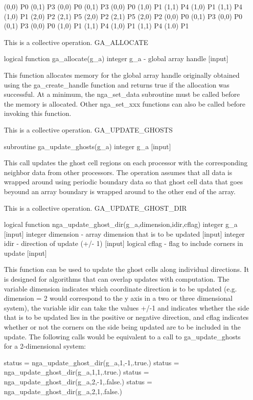 (0,0) P0 (0,1) P3 (0,0) P0 (0,1) P3 (0,0) P0 (1,0) P1 (1,1) P4 (1,0)
P1 (1,1) P4 (1,0) P1 (2,0) P2 (2,1) P5 (2,0) P2 (2,1) P5 (2,0) P2
(0,0) P0 (0,1) P3 (0,0) P0 (0,1) P3 (0,0) P0 (1,0) P1 (1,1) P4 (1,0)
P1 (1,1) P4 (1.0) P1

This is a collective operation. GA\_ALLOCATE

logical function ga\_allocate(g\_a) integer g\_a - global array handle
{[}input{]}

This function allocates memory for the global array handle originally
obtained using the ga\_create\_handle function and returns true if
the allocation was successful. At a minimum, the nga\_set\_data subroutine
must be called before the memory is allocated. Other nga\_set\_xxx
functions can also be called before invoking this function.

This is a collective operation. GA\_UPDATE\_GHOSTS

subroutine ga\_update\_ghosts(g\_a) integer g\_a {[}input{]}

This call updates the ghost cell regions on each processor with the
corresponding neighbor data from other processors. The operation assumes
that all data is wrapped around using periodic boundary data so that
ghost cell data that goes beyound an array boundary is wrapped around
to the other end of the array.

This is a collective operation. GA\_UPDATE\_GHOST\_DIR

logical function nga\_update\_ghost\_dir(g\_a,dimension,idir,cflag)
integer g\_a {[}input{]} integer dimension - array dimension that
is to be updated {[}input{]} integer idir - direction of update (+/-
1) {[}input{]} logical cflag - flag to include corners in update {[}input{]}

This function can be used to update the ghost cells along individual
directions. It is designed for algorithms that can overlap updates
with computation. The variable dimension indicates which coordinate
direction is to be updated (e.g. dimension = 2 would correspond to
the y axis in a two or three dimensional system), the variable idir
can take the values +/-1 and indicates whether the side that is to
be updated lies in the positive or negative direction, and cflag indicates
whether or not the corners on the side being updated are to be included
in the update. The following calls would be equivalent to a call to
ga\_update\_ghosts for a 2-dimensional system: 

status = nga\_update\_ghost\_dir(g\_a,1,-1,.true.) status = nga\_update\_ghost\_dir(g\_a,1,1,.true.)
status = nga\_update\_ghost\_dir(g\_a,2,-1,.false.) status = nga\_update\_ghost\_dir(g\_a,2,1,.false.)


